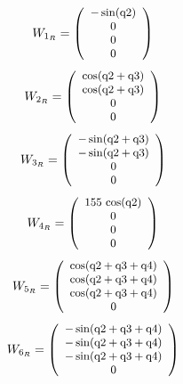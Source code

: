 \documentclass[fleqn, a4paper, 5pt, russian]{article}
\begin{document}
\begin{landscape}
\begin{equation}
\small{
	W_{1_R}=
	\left(\begin{array}{c} - \sin\!\left(\mathrm{q2}\right)\\ 0\\ 0\\ 0 \end{array}\right)
}\end{equation}
\begin{equation}
\small{
	W_{2_R}=
	\left(\begin{array}{c} \cos\!\left(\mathrm{q2} + \mathrm{q3}\right)\\ \cos\!\left(\mathrm{q2} + \mathrm{q3}\right)\\ 0\\ 0 \end{array}\right)
}\end{equation}
\begin{equation}
\small{
	W_{3_R}=
	\left(\begin{array}{c} - \sin\!\left(\mathrm{q2} + \mathrm{q3}\right)\\ - \sin\!\left(\mathrm{q2} + \mathrm{q3}\right)\\ 0\\ 0 \end{array}\right)
}\end{equation}
\begin{equation}
\small{
	W_{4_R}=
	\left(\begin{array}{c} 155\, \cos\!\left(\mathrm{q2}\right)\\ 0\\ 0\\ 0 \end{array}\right)
}\end{equation}
\begin{equation}
\small{
	W_{5_R}=
	\left(\begin{array}{c} \cos\!\left(\mathrm{q2} + \mathrm{q3} + \mathrm{q4}\right)\\ \cos\!\left(\mathrm{q2} + \mathrm{q3} + \mathrm{q4}\right)\\ \cos\!\left(\mathrm{q2} + \mathrm{q3} + \mathrm{q4}\right)\\ 0 \end{array}\right)
}\end{equation}
\begin{equation}
\small{
	W_{6_R}=
	\left(\begin{array}{c} - \sin\!\left(\mathrm{q2} + \mathrm{q3} + \mathrm{q4}\right)\\ - \sin\!\left(\mathrm{q2} + \mathrm{q3} + \mathrm{q4}\right)\\ - \sin\!\left(\mathrm{q2} + \mathrm{q3} + \mathrm{q4}\right)\\ 0 \end{array}\right)
}
\end{equation}
\end{landscape}
\end{document}
